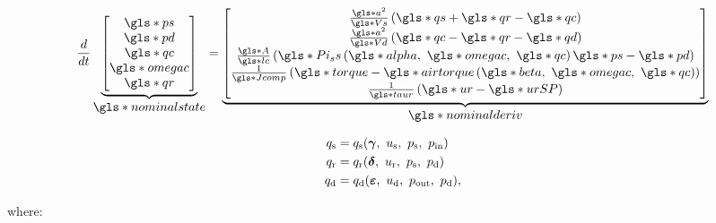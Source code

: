 \begin{equation}
    \dt{} \ubrace{\begin{bmatrix}
      \g{ps}\\
      \g{pd}\\
      \g{qc}\\
      \g{omegac}\\
      \g{qr}
    \end{bmatrix}}{\g{nominalstate}} =
    \ubrace{\begin{bmatrix}
      \frac{\g{a}^2}{\g{Vs}}\left(\g{qs}+\g{qr}-\g{qc}\right)\\
      \frac{\g{a}^2}{\g{Vd}}\left(\g{qc}-\g{qr}-\g{qd}\right)\\
      \frac{\g{A}}{\g{lc}}\left(\g{Pi_ss}\left(\g{alpha},\ \g{omegac},\ \g{qc} \right)\g{ps} - \g{pd}  \right)\\
      \frac{1}{\g{Jcomp}}\left(\g{torque} - \g{airtorque}\left(\g{beta},\ \g{omegac},\ \g{qc}\right)\right)\\
      \frac{1}{\g{taur}}\left(\g{ur} - \g{urSP} \right)
    \end{bmatrix}}{\g{nominalderiv}}
  \label{eq:mod:single_comp_states}
\end{equation}

\begin{equation}
  \begin{split}
    q_\text{s} & = q_\text{s}(\vc{\gamma},\ u_{\text{s}},\ p_\text{s},\ p_{\text{in}})\\
    q_\text{r} & = q_\text{r}(\vc{\delta},\ u_\text{r},\ p_\text{s},\ p_\text{d})\\
    q_\text{d} & = q_\text{d}(\vc{\varepsilon},\ u_{\text{d}},\ p_{\text{out}},\ p_\text{d}),
  \end{split}
\end{equation}

\noindent where:

